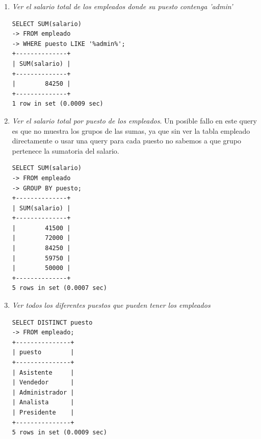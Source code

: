 \documentclass[titlepage,a4paper]{article}
\theoremstyle{definition}
\theoremstyle{remark}
\begin{document}
\begin{enumerate}
    \item \textit{Ver el salario total de los empleados donde su puesto contenga 'admin'}
    \begin{lstlisting}
SELECT SUM(salario)
-> FROM empleado
-> WHERE puesto LIKE '%admin%';
+--------------+
| SUM(salario) |
+--------------+
|        84250 |
+--------------+
1 row in set (0.0009 sec)
    \end{lstlisting}


    \item \textit{Ver el salario total por puesto de los empleados}. Un posible fallo en este query es que no muestra los grupos de las sumas, ya que sin ver la tabla empleado directamente o usar una query para cada puesto no sabemos a que grupo pertenece la sumatoria del salario.
    \begin{lstlisting}
SELECT SUM(salario)
-> FROM empleado
-> GROUP BY puesto;
+--------------+
| SUM(salario) |
+--------------+
|        41500 |
|        72000 |
|        84250 |
|        59750 |
|        50000 |
+--------------+
5 rows in set (0.0007 sec)
    \end{lstlisting}

    \item \textit{Ver todos los diferentes puestos que pueden tener los empleados}
    \begin{lstlisting}
SELECT DISTINCT puesto
-> FROM empleado;
+---------------+
| puesto        |
+---------------+
| Asistente     |
| Vendedor      |
| Administrador |
| Analista      |
| Presidente    |
+---------------+
5 rows in set (0.0009 sec)
    \end{lstlisting}



\end{enumerate}
\end{document}
